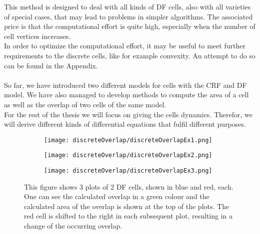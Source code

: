 \documentclass[a4paper,12pt,leqno]{article}
\theoremstyle{plain}
\theoremstyle{remark}
\begin{document}
This method is designed to deal with all kinds of DF cells, also with all varieties of special cases, that may lead to problems in simpler algorithms. The associated price is that the computational effort is quite high, especially when the number of cell vertices increases. \\
In order to optimize the computational effort, it may be useful to meet further requirements to the discrete cells, like for example convexity. An attempt to do so can be found in the Appendix. \\
\smallskip \\
So far, we have introduced two different models for cells with the CRF and DF model. We have also managed to develop methods to compute the area of a cell as well as the overlap of two cells of the same model. \\
For the rest of the thesis we will focus on giving the cells dynamics. Therefor, we will derive different kinds of differential equations that fulfil different purposes. \\
\begin{figure}[t!]
	\centering
	\begin{subfigure}{0.3\textwidth}
		\texttt{[image: discreteOverlap/discreteOverlapEx1.png]}
	\end{subfigure}
	\hfill
	\begin{subfigure}{0.3\textwidth}
		\texttt{[image: discreteOverlap/discreteOverlapEx2.png]}
	\end{subfigure}
	\hfill
	\begin{subfigure}{0.3\textwidth}
		\texttt{[image: discreteOverlap/discreteOverlapEx3.png]}
	\end{subfigure}\hfill
	\caption{This figure shows 3 plots of 2 DF cells, shown in blue and red, each. One can see the calculated overlap in a green colour and the calculated area of the overlap is shown at the top of the plots. The red cell is shifted to the right in each subsequent plot, resulting in a change of the occurring overlap.}
	\label{fig:finalDiscreteOverlap}
\end{figure}



\newpage
\end{document}
